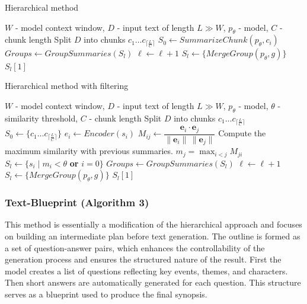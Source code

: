 \documentclass{superfri}
\begin{document}
\noindent
\begin{minipage}[t]{0.49\textwidth}
  \begin{algorithm}[H]
  \caption{Hierarchical method}
    \begin{algorithmic}
      \Require $W$ - model context window, $D$ - input text of length $L \gg W$, $p_\theta$ - model, $C$ - chunk length
      \State Split $D$ into chunks $c_1\dots c_{\lceil \frac{L}{C} \rceil}$
        \State $S_0 \gets SummarizeChunk(p_\theta, c_i)$\
      \EndFor
      \Repeat
        \State $Groups \gets GroupSummaries(S_l)$
        \State $\ell \gets \ell + 1$
          \State $S_l \gets \{MergeGroup(p_\theta,g)\}$
        \EndFor
      \State \Return $S_l[1]$
    \end{algorithmic}
  \end{algorithm}
\end{minipage}\hfill
\begin{minipage}[t]{0.49\textwidth}
  \begin{algorithm}[H]
    \caption{Hierarchical method with filtering}
    \begin{algorithmic}
      \Require $W$ - model context window, $D$ - input text of length $L \gg W$, $p_\theta$ - model, $\theta$ - similarity threshold, $C$ - chunk length
      \State Split $D$ into chunks $c_1\dots c_{\lceil \frac{L}{C} \rceil}$
      \State $S_0 \gets \{c_1\dots c_{\lceil \frac{L}{C} \rceil}\}$
      \Repeat
          \State $e_i \gets Encoder(s_i)$
          \State $M_{ij} \gets \dfrac{\mathbf{e}_i\cdot \mathbf{e}_j}{\|\mathbf{e}_i\|\,\|\mathbf{e}_j\|}$
          \State Compute the maximum similarity
        \State with previous summaries.
          \State $m_j=\max_{i<j} M_{ji}$
          \State $S_l \gets \{s_i \mid m_i < \theta$ \textbf{ or } $i = 0 \}$ 
        \EndFor
        \State $Groups \gets GroupSummaries(S_l)$
        \State $\ell \gets \ell + 1$
          \State $S_l \gets \{MergeGroup(p_\theta,g)\}$
        \EndFor
      \State \Return $S_l[1]$
    \end{algorithmic}
  \end{algorithm}
\end{minipage}

\vspace{0.4em}
\subsubsection{Text-Blueprint (Algorithm 3)}
This method \cite{blueprint} is essentially a modification of the hierarchical approach and focuses on building an intermediate plan before text generation.
The outline is formed as a set of question-answer pairs, which enhances the controllability of the generation process and ensures the structured nature of the result.
First the model creates a list of questions reflecting key events, themes, and characters. Then short answers are automatically generated for each question.
This structure serves as a blueprint used to produce the final synopsis.
\end{document}
